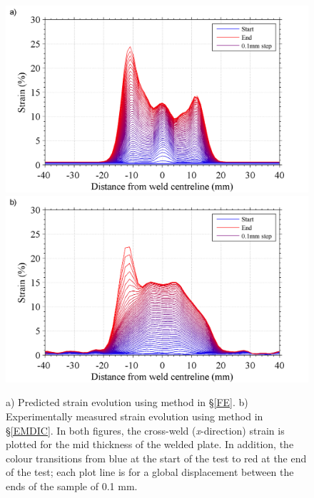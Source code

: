 \begin{figure}[h!]
	\centering
	\includegraphics[width=1\linewidth]{PredictedXstrainaltered}		\includegraphics[width=1\linewidth]{DICcrossweldStrainaltered}
	\caption[Mesh]{a) Predicted strain evolution using method in \S\ref{FE}. b) Experimentally measured strain evolution using method in \S\ref{EMDIC}. In both figures, the cross-weld (\textit{x}-direction) strain is plotted for the mid thickness of the welded plate. In addition, the colour transitions from blue at the start of the test to red at the end of the test; each plot line is for a global displacement between the ends of the sample of 0.1 mm.}
	\label{fig:UniaxialStrainPredicted}	
\end{figure} 


